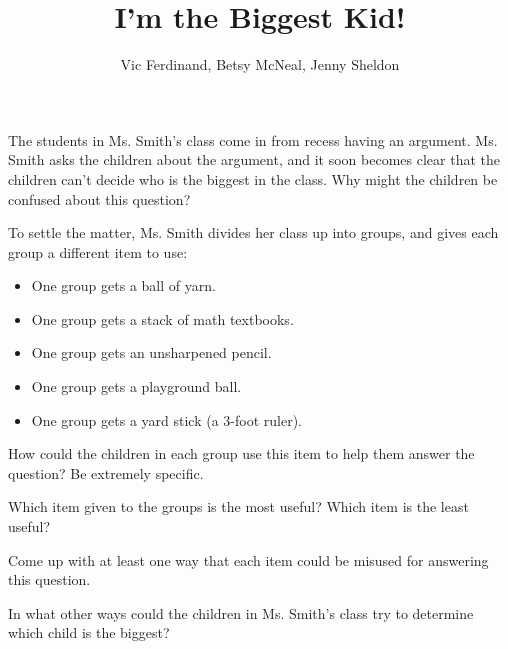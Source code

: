 \documentclass[]{ximera}
\title{I'm the Biggest Kid!}
\author{Vic Ferdinand, Betsy McNeal, Jenny Sheldon}
\begin{document}
\begin{abstract}\end{abstract}
\maketitle



\begin{problem}
    The students in Ms. Smith's class come in from recess having an argument.  Ms. Smith asks the children about the argument, and it soon becomes clear that the children can't decide who is the biggest in the class.  Why might the children be confused about this question?
\end{problem}


\begin{problem} \label{BiggestKid2}
    To settle the matter, Ms. Smith divides her class up into groups, and gives each group a different item to use:
    \begin{itemize}
        \item One group gets a ball of yarn.
        \item One group gets a stack of math textbooks.
        \item One group gets an unsharpened pencil.
        \item One group gets a playground ball.
        \item One group gets a yard stick (a 3-foot ruler).
    \end{itemize}
    
    How could the children in each group use this item to help them answer the question?  Be extremely specific.
\end{problem}

\begin{problem} \label{BiggestKid3}
    Which item given to the groups is the most useful?  Which item is the least useful?
    
    Come up with at least one way that each item could be misused for answering this question.
\end{problem}

\begin{problem}
    In what other ways could the children in Ms. Smith's class try to determine which child is the biggest?
\end{problem}


\newpage
\end{document}
